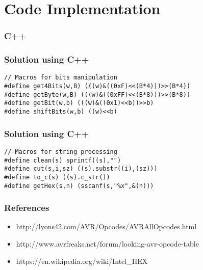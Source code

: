 \documentclass{beamer}
\begin{document}
\section{Code Implementation}
\begin{frame}
\frametitle{C++}

\end{frame}

\begin{frame}[fragile]
\frametitle{ Solution using C++ }
\begin{example}[ C++ Implementation ]
\begin{lstlisting}
// Macros for bits manipulation
#define get4Bits(w,B) (((w)&((0xF)<<(B*4)))>>(B*4))
#define getByte(w,B) (((w)&((0xFF)<<(B*8)))>>(B*8))
#define getBit(w,b) (((w)&((0x1)<<b))>>b)
#define shiftBits(w,b) ((w)<<b)
\end{lstlisting}
\end{example}
\end{frame}
\begin{frame}[fragile]
\frametitle{ Solution using C++ }
\begin{example}[ C++ Implementation ]
\begin{lstlisting}
// Macros for string processing
#define clean(s) sprintf((s),"")
#define cut(s,i,sz) ((s).substr((i),(sz)))
#define to_c(s) ((s).c_str())
#define getHex(s,n) (sscanf(s,"%x",&(n)))
\end{lstlisting}
\end{example}
\end{frame}
\begin{frame}
\frametitle{ References }
\begin{itemize}
	\item http://lyons42.com/AVR/Opcodes/AVRAllOpcodes.html
	\item http://www.avrfreaks.net/forum/looking-avr-opcode-table
	\item https://en.wikipedia.org/wiki/Intel\_HEX
\end{itemize}
\end{frame}
\end{document}
